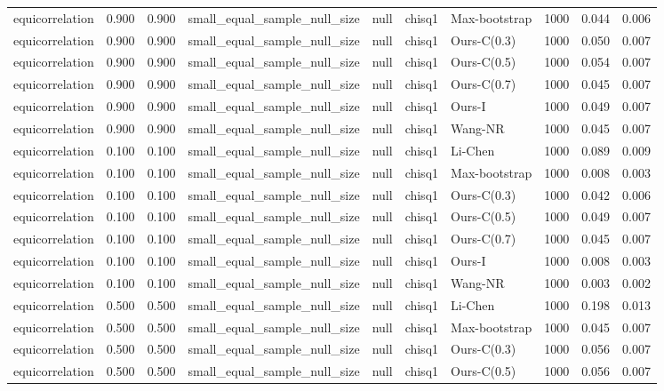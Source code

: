 \begin{tabular}{lrrllllrrr}
equicorrelation & 0.900 & 0.900 & small\_equal\_sample\_null\_size & null & chisq1 & Max-bootstrap & 1000 & 0.044 & 0.006 \\
equicorrelation & 0.900 & 0.900 & small\_equal\_sample\_null\_size & null & chisq1 & Ours-C(0.3) & 1000 & 0.050 & 0.007 \\
equicorrelation & 0.900 & 0.900 & small\_equal\_sample\_null\_size & null & chisq1 & Ours-C(0.5) & 1000 & 0.054 & 0.007 \\
equicorrelation & 0.900 & 0.900 & small\_equal\_sample\_null\_size & null & chisq1 & Ours-C(0.7) & 1000 & 0.045 & 0.007 \\
equicorrelation & 0.900 & 0.900 & small\_equal\_sample\_null\_size & null & chisq1 & Ours-I & 1000 & 0.049 & 0.007 \\
equicorrelation & 0.900 & 0.900 & small\_equal\_sample\_null\_size & null & chisq1 & Wang-NR & 1000 & 0.045 & 0.007 \\
equicorrelation & 0.100 & 0.100 & small\_equal\_sample\_null\_size & null & chisq1 & Li-Chen & 1000 & 0.089 & 0.009 \\
equicorrelation & 0.100 & 0.100 & small\_equal\_sample\_null\_size & null & chisq1 & Max-bootstrap & 1000 & 0.008 & 0.003 \\
equicorrelation & 0.100 & 0.100 & small\_equal\_sample\_null\_size & null & chisq1 & Ours-C(0.3) & 1000 & 0.042 & 0.006 \\
equicorrelation & 0.100 & 0.100 & small\_equal\_sample\_null\_size & null & chisq1 & Ours-C(0.5) & 1000 & 0.049 & 0.007 \\
equicorrelation & 0.100 & 0.100 & small\_equal\_sample\_null\_size & null & chisq1 & Ours-C(0.7) & 1000 & 0.045 & 0.007 \\
equicorrelation & 0.100 & 0.100 & small\_equal\_sample\_null\_size & null & chisq1 & Ours-I & 1000 & 0.008 & 0.003 \\
equicorrelation & 0.100 & 0.100 & small\_equal\_sample\_null\_size & null & chisq1 & Wang-NR & 1000 & 0.003 & 0.002 \\
equicorrelation & 0.500 & 0.500 & small\_equal\_sample\_null\_size & null & chisq1 & Li-Chen & 1000 & 0.198 & 0.013 \\
equicorrelation & 0.500 & 0.500 & small\_equal\_sample\_null\_size & null & chisq1 & Max-bootstrap & 1000 & 0.045 & 0.007 \\
equicorrelation & 0.500 & 0.500 & small\_equal\_sample\_null\_size & null & chisq1 & Ours-C(0.3) & 1000 & 0.056 & 0.007 \\
equicorrelation & 0.500 & 0.500 & small\_equal\_sample\_null\_size & null & chisq1 & Ours-C(0.5) & 1000 & 0.056 & 0.007 \\

\end{tabular}
